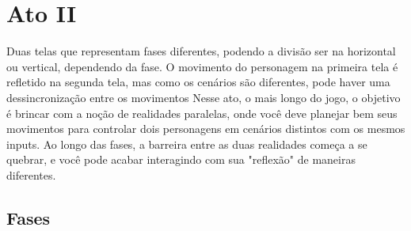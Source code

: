 \documentclass[a4paper, 11pt]{article}
\begin{document}
\section{Ato II} 
 
	Duas telas que representam fases diferentes, podendo a divisão ser na horizontal ou vertical, dependendo da fase. 
	O movimento do personagem na primeira tela é refletido na segunda tela, mas como os cenários são diferentes, pode 
	haver uma dessincronização entre os movimentos 
	Nesse ato, o mais longo do jogo, o objetivo é brincar com a noção de realidades paralelas, onde você deve planejar 
	bem seus movimentos para controlar dois personagens em cenários distintos com os mesmos inputs. Ao longo das fases, 
	a barreira entre as duas realidades começa a se quebrar, e você pode acabar interagindo com sua "reflexão" de  
	maneiras diferentes. 
 
\subsection{Fases} 
 
\end{document}
